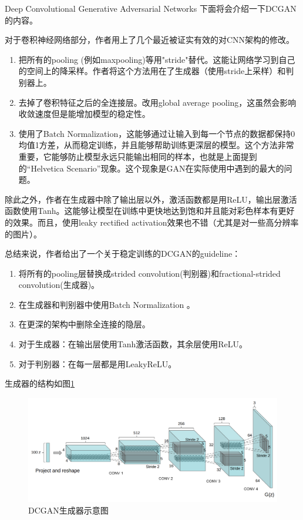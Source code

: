 \documentclass{ctexart}
\begin{document}
\begin{section}{Deep Convolutional Generative Adversarial Networks}
		下面将会介绍一下DCGAN的内容。
		
		对于卷积神经网络部分，作者用上了几个最近被证实有效的对CNN架构的修改。
		
		\begin{enumerate}
			\item 把所有的pooling (例如maxpooling)等用"stride"替代。这能让网络学习到自己的空间上的降采样。作者将这个方法用在了生成器（使用stride上采样）和判别器上。
			\item 去掉了卷积特征之后的全连接层。改用global average pooling，这虽然会影响收敛速度但是能增加模型的稳定性。
			\item 使用了Batch Normalization，这能够通过让输入到每一个节点的数据都保持0均值1方差，从而稳定训练，并且能够帮助训练更深层的模型。这个方法非常重要，它能够防止模型永远只能输出相同的样本，也就是上面提到的“Helvetica Scenario”现象。这个现象是GAN在实际使用中遇到的最大的问题。
		\end{enumerate}
	
		除此之外，作者在生成器中除了输出层以外，激活函数都是用ReLU，输出层激活函数使用Tanh。这能够让模型在训练中更快地达到饱和并且能对彩色样本有更好的效果。而且，使用leaky rectified activation效果也不错（尤其是对一些高分辨率的图片）。
		
		总结来说，作者给出了一个关于稳定训练的DCGAN的guideline：
		
		\begin{enumerate}
			\item 将所有的pooling层替换成strided convolution(判别器)和fractional-strided convolution(生成器)。
			\item 在生成器和判别器中使用Batch Normalization 。
			\item 在更深的架构中删除全连接的隐层。
			\item 对于生成器：在输出层使用Tanh激活函数，其余层使用ReLU。
			\item 对于判别器：在每一层都是用LeakyReLU。
		\end{enumerate}
		
		生成器的结构如图\ref{fig:dcgan-gen-struct}
		
		\begin{figure}
			\centering
			\includegraphics[width=35em]{figures/DCGAN-generator-structure.PNG}
			\caption{DCGAN生成器示意图}
			\label{fig:dcgan-gen-struct}
		\end{figure}
	

\end{section}
\end{document}
